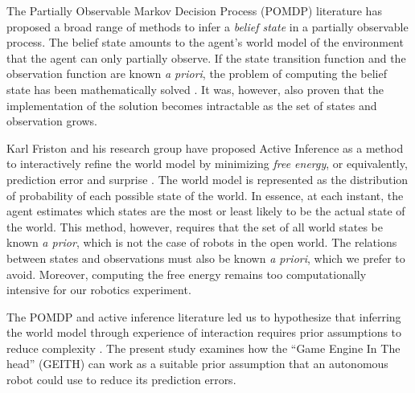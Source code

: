 \documentclass[runningheads]{llncs}
\begin{document}
The Partially Observable Markov Decision Process (POMDP) literature has proposed a broad range of methods to infer a \textit{belief state} in a partially observable process.
The belief state amounts to the agent's world model of the environment that the agent can only partially observe.  
If the state transition function and the observation function are known \textit{a priori}, the problem of computing the belief state has been mathematically solved \cite{astrom1965optimal}. 
It was, however, also proven that the implementation of the solution becomes intractable as the set of states and observation grows. 

Karl Friston and his research group have proposed Active Inference \cite[e.g.]{smith_step-by-step_2022} as a method to interactively refine the world model by minimizing \textit{free energy}, or equivalently, prediction error and surprise \cite{friston_free-energy_2010}.
The world model %
is represented as the distribution of probability %
of each possible state of the world. 
In essence, at each instant, the agent estimates which states are the most or least likely to be the actual state of the world.
This method, however, requires that the set of all world states %
be known \textit{a prior}, which is not the case of robots in the open world.
The relations between states and observations must also be known \textit{a priori}, which we prefer to avoid.
Moreover, computing the free energy remains too computationally intensive for our robotics experiment.

The POMDP and active inference literature led us to hypothesize that inferring the world model through experience of interaction requires prior assumptions to reduce complexity \cite{georgeon_artificial_2024}. 
The present study examines how the ``Game Engine In The head'' (GEITH) can work as a suitable prior assumption that an autonomous robot could use to reduce its prediction errors. 
\end{document}
